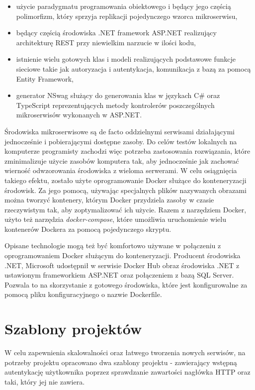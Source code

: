 \documentclass{SGGW-thesis}
\begin{document}
  \begin{itemize}
    \item użycie paradygmatu programowania obiektowego i będący jego częścią polimorfizm, który sprzyja replikacji pojedynczego wzorca mikroserwisu,
    \item będący częścią środowiska .NET framework ASP.NET realizujący architekturę REST przy niewielkim narzucie w ilości kodu,
    \item istnienie wielu gotowych klas i modeli realizujących podstawowe funkcje sieciowe takie jak autoryzacja i autentykacja, komunikacja z bazą za pomocą Entity Framework,
    \item generator NSwag służący do generowania klas w językach C\# oraz TypeScript reprezentujących metody kontrolerów poszczególnych mikroserwisów wykonanych w ASP.NET.
  \end{itemize}

  Środowiska mikroserwisowe są de facto oddzielnymi serwisami działającymi jednocześnie i pobierającymi dostępne zasoby. Do celów testów lokalnych na komputerze programisty zachodzi więc potrzeba zastosowania rozwiązania, które zminimalizuje użycie zasobów komputera tak, aby jednocześnie jak zachować wierność odwzorowania środowiska z wieloma serwerami. W celu osiągnięcia takiego efektu, zostało użyte oprogramowanie Docker służące do konteneryzacji środowisk. Za jego pomocą, używając specjalnych plików nazywanych obrazami można tworzyć kontenery, którym Docker przydziela zasoby w czasie rzeczywistym tak, aby zoptymalizować ich użycie. 
  Razem z narzędziem Docker, użyto też narzędzia \textit{docker-compose}, które umożliwia uruchomienie wielu kontenerów Dockera za pomocą pojedynczego skryptu.

  Opisane technologie mogą też być komfortowo używane w połączeniu z oprogramowaniem Docker służącym do konteneryzacji. Producent środowiska .NET, Microsoft udostępnił w serwisie Docker Hub obraz środowiska .NET z ustawionym frameworkiem ASP.NET oraz połączeniem z bazą SQL Server. Pozwala to na skorzystanie z gotowego środowiska, które jest konfigurowalne za pomocą pliku konfiguracyjnego o nazwie Dockerfile.

  \section{Szablony projektów}
  W celu zapewnienia skalowalności oraz łatwego tworzenia nowych serwisów, na potrzeby projektu opracowano dwa szablony projektu - zawierający wstępną autentykację użytkownika poprzez sprawdzanie zawartości nagłówka HTTP oraz taki, który jej nie zawiera.
\end{document}
